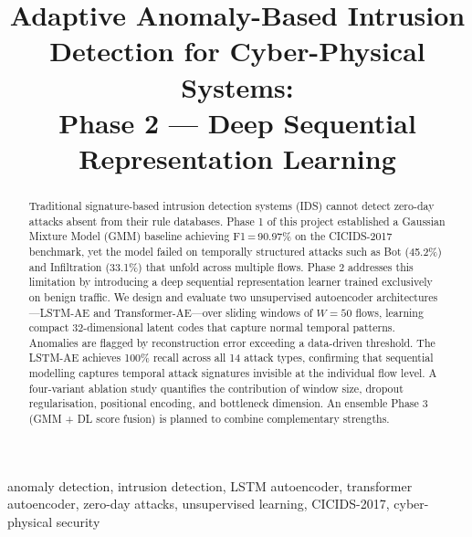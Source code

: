 \documentclass[conference]{IEEEtran}
\begin{document}
\title{Adaptive Anomaly-Based Intrusion Detection for Cyber-Physical Systems:\\
Phase 2 — Deep Sequential Representation Learning}

\author{
  \and
}

\maketitle

\begin{abstract}
Traditional signature-based intrusion detection systems (IDS) cannot detect zero-day attacks
absent from their rule databases. Phase 1 of this project established a Gaussian Mixture Model
(GMM) baseline achieving F1\,=\,90.97\% on the CICIDS-2017 benchmark, yet the model failed on
temporally structured attacks such as Bot (45.2\%) and Infiltration (33.1\%) that unfold across
multiple flows. Phase 2 addresses this limitation by introducing a deep sequential representation
learner trained exclusively on benign traffic. We design and evaluate two unsupervised
autoencoder architectures—LSTM-AE and Transformer-AE—over sliding windows of $W=50$ flows,
learning compact 32-dimensional latent codes that capture normal temporal patterns. Anomalies are
flagged by reconstruction error exceeding a data-driven threshold. The LSTM-AE achieves
100\% recall across all 14 attack types, confirming that sequential modelling captures temporal
attack signatures invisible at the individual flow level. A four-variant ablation study
quantifies the contribution of window size, dropout regularisation, positional encoding, and
bottleneck dimension. An ensemble Phase 3 (GMM + DL score fusion) is planned to combine
complementary strengths.
\end{abstract}

\begin{IEEEkeywords}
anomaly detection, intrusion detection, LSTM autoencoder, transformer autoencoder,
zero-day attacks, unsupervised learning, CICIDS-2017, cyber-physical security
\end{IEEEkeywords}
\end{document}
